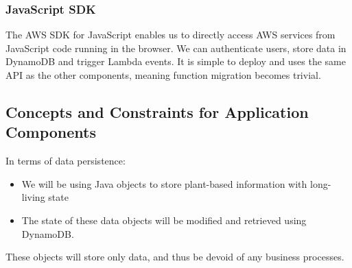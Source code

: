 \documentclass{article}
\begin{document}
	\subsubsection{JavaScript SDK}
		The AWS SDK for JavaScript enables us to directly access AWS services from JavaScript code running in the browser. We can authenticate users, store data in DynamoDB and trigger Lambda events. It is simple to deploy and uses the same API as the other components, meaning function migration becomes trivial.

\subsection{Concepts and Constraints for Application Components}
In terms of data persistence:
\begin{itemize}
	\item We will be using Java objects to store plant-based information with long-living state
	\item The state of these data objects will be modified and retrieved using DynamoDB.
\end{itemize}
These objects will store only data, and thus be devoid of any business processes.
\end{document}
